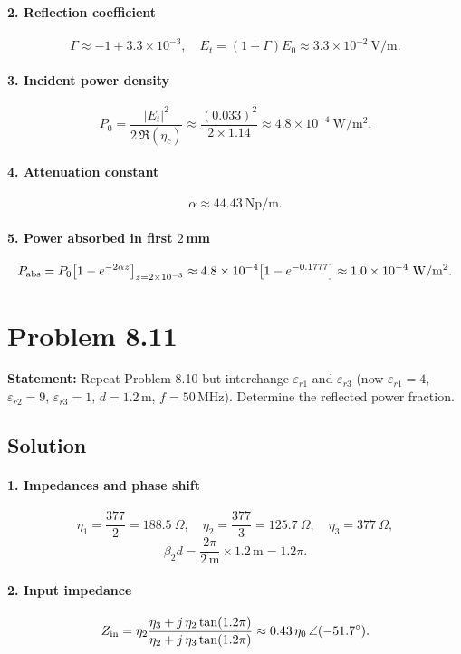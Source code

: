 \paragraph{2. Reflection coefficient}
\[
\Gamma \approx -1 + 3.3\times10^{-3},
\quad
E_t = (1+\Gamma)E_0 \approx 3.3\times10^{-2}\ \mathrm{V/m}.
\]
\paragraph{3. Incident power density}
\[
P_0 = \frac{|E_t|^2}{2\,\Re(\eta_c)} 
    \approx \frac{(0.033)^2}{2\times1.14} 
    \approx 4.8\times10^{-4}\ \mathrm{W/m^2}.
\]
\paragraph{4. Attenuation constant}
\[
\alpha \approx 44.43\ \mathrm{Np/m}.
\]
\paragraph{5. Power absorbed in first $2\,$mm}
\[
P_{\rm abs}
= P_0 \bigl[1 - e^{-2\alpha z}\bigr]_{z=2\times10^{-3}}
\approx 4.8\times10^{-4}\bigl[1 - e^{-0.1777}\bigr]
\approx 1.0\times10^{-4}\ \mathrm{W/m^2}.
\]

\section*{Problem 8.11}
\textbf{Statement:} Repeat Problem 8.10 but interchange $\varepsilon_{r1}$ and $\varepsilon_{r3}$ (now $\varepsilon_{r1}=4$, $\varepsilon_{r2}=9$, $\varepsilon_{r3}=1$, $d=1.2\,$m, $f=50\,$MHz). Determine the reflected power fraction.

\subsection*{Solution}
\paragraph{1. Impedances and phase shift}
\[
\eta_1 = \frac{377}{2} = 188.5\ \Omega,\quad
\eta_2 = \frac{377}{3} = 125.7\ \Omega,\quad
\eta_3 = 377\ \Omega,
\]
\[
\beta_2 d = \frac{2\pi}{2\,\mathrm m}\times1.2\,\mathrm m = 1.2\pi.
\]

\paragraph{2. Input impedance}
\[
Z_{\rm in}
= \eta_2
  \frac{\eta_3 + j\,\eta_2\tan(1.2\pi)}
       {\eta_2 + j\,\eta_3\tan(1.2\pi)}
\approx 0.43\,\eta_0\,\angle(-51.7^\circ).
\]

